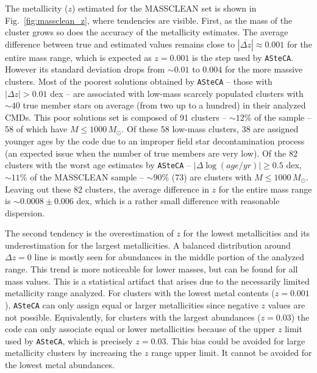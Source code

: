 \documentclass{aa}
\begin{document}
\begin{appendix}
The metallicity ($z$) estimated for the MASSCLEAN set is shown in
Fig.~\ref{fig:massclean_z}, where tendencies are visible.
%
First, as the mass of the cluster grows so does the accuracy of the
metallicity estimates. The average difference between true and
estimated values remains close to $|\overline{\Delta z}|{\approx}0.001$ for the
entire mass range, which is expected as $z{=}0.001$ is the step used by
\texttt{ASteCA}. However its standard deviation drops from ${\sim}0.01$ to
$0.004$ for the more massive clusters.
%
%
Most of the poorest solutions obtained by \texttt{ASteCA} -- those with
$|\Delta z|{>}0.01$ dex -- are associated with low-mass scarcely populated
clusters with ${\sim}40$ true member stars on average (from two up to a
hundred) in their analyzed CMDs. This poor solutions set is composed of 91
clusters -- ${\sim}12\%$ of the sample -- 58 of which have
$M{\le}1000\,M_{\odot}$.
%
Of these 58 low-mass clusters, 38 are assigned younger ages by the code due to
an improper field star decontamination process (an expected issue when the
number of true members are very low).
%
Of the 82 clusters with the worst age estimates by \texttt{ASteCA} --
$|\Delta\log(age/yr)|{\ge}0.5$ dex, ${\sim}11\%$ of the MASSCLEAN sample --
${\sim}90\%$ (73) are clusters with $M{\le}1000\,M_{\odot}$.
%
Leaving out these 82 clusters, the average difference in $z$
for the entire mass range is ${\sim}0.0008{\pm}0.006$ dex, which is a rather
small difference with reasonable dispersion.

The second tendency is the overestimation of $z$ for the lowest metallicities
and its underestimation for the largest metallicities.
A balanced distribution around $\Delta z{=}0$ line is mostly seen for
abundances in the middle portion of the analyzed range. This trend is more
noticeable for lower masses, but can be found for all mass values.
%
This is a statistical artifact that arises due to the necessarily limited
metallicity range analyzed. For clusters with the lowest metal contents ($z
{=}0.001$), \texttt{ASteCA} can only assign equal or larger metallicities since
negative $z$ values are not possible.
Equivalently, for clusters with the largest abundances ($z{=}0.03$) the code
can only associate equal or lower metallicities because of the upper
$z$ limit used by \texttt{ASteCA}, which is precisely $z{=}0.03$.
This bias could be avoided for large metallicity clusters by
increasing the $z$ range upper limit. It cannot be avoided for the lowest metal
abundances.\\


\end{appendix}
\end{document}
